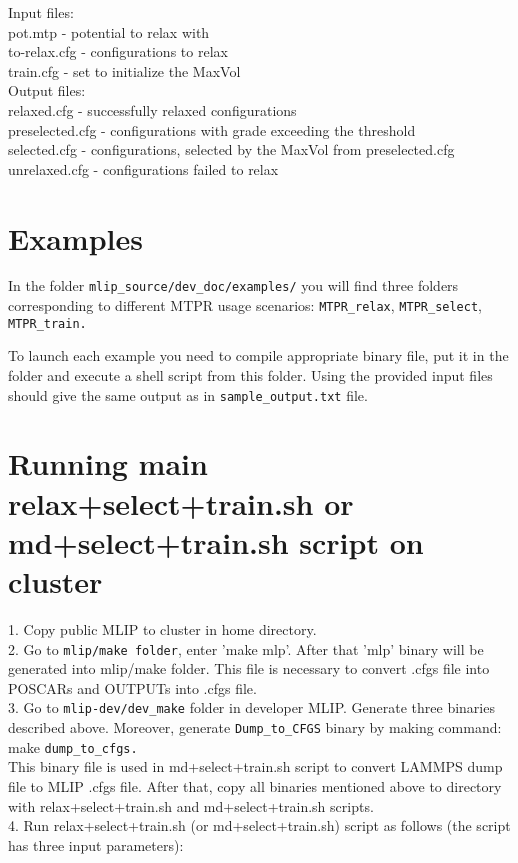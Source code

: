 \documentclass[12pt]{article}
\renewcommand{\_}{\char`_}
\begin{document}
Input files:\\
pot.mtp - potential to relax with\\
to-relax.cfg - configurations to relax\\
train.cfg - set to initialize the MaxVol\\

Output files:\\
relaxed.cfg - successfully relaxed configurations\\
preselected.cfg - configurations with grade exceeding the threshold\\
selected.cfg - configurations, selected by the MaxVol from preselected.cfg \\
unrelaxed.cfg - configurations failed to relax\\



\section*{Examples}

In the folder \verb|mlip_source/dev_doc/examples/| you will find three folders 
corresponding to different MTPR usage scenarios: \verb|MTPR_relax|, \verb|MTPR_select|, 
\verb|MTPR_train.| 

To launch each example you need to compile appropriate binary file,
put it in the folder and execute a shell script from this folder. Using the 
provided input files should give the same output as in \verb|sample_output.txt| file.

\section*{Running main relax+select+train.sh or md+select+train.sh script on cluster}

1. Copy public MLIP to cluster in home directory.\\
2. Go to \verb|mlip/make folder|, enter 'make mlp'. After that 'mlp' binary will be generated into mlip/make folder. 
This file is necessary to convert .cfgs file into POSCARs and OUTPUTs into .cfgs file. \\
3. Go to  \verb|mlip-dev/dev_make| folder in developer MLIP. Generate three binaries described above. Moreover, generate 
\verb|Dump_to_CFGS| binary by making command: \\
make \verb|dump_to_cfgs.|\\ 
\noindent This binary file is used in md+select+train.sh script to convert LAMMPS dump file to MLIP .cfgs file. 
After that, copy all binaries mentioned above to directory with relax+select+train.sh and md+select+train.sh scripts.\\
4. Run relax+select+train.sh (or md+select+train.sh) script as follows (the script has three input parameters):\\
\end{document}
